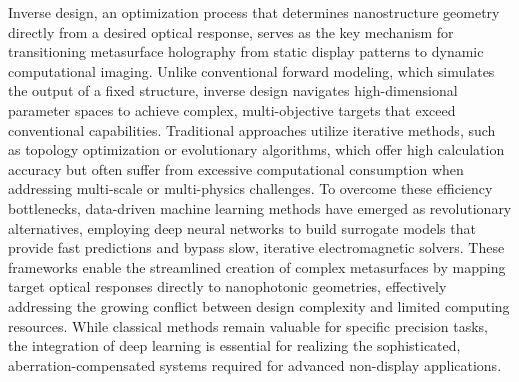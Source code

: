 Inverse design, an optimization process that determines nanostructure geometry directly from a desired optical response, serves as the key mechanism for transitioning metasurface holography from static display patterns to dynamic computational imaging. \citep{doi_10_48550_arxiv_2506_21748_dc49c062} \citep{doi_10_1117_12_3099014_831c7349} Unlike conventional forward modeling, which simulates the output of a fixed structure, inverse design navigates high-dimensional parameter spaces to achieve complex, multi-objective targets that exceed conventional capabilities. Traditional approaches utilize iterative methods, such as topology optimization or evolutionary algorithms, which offer high calculation accuracy but often suffer from excessive computational consumption when addressing multi-scale or multi-physics challenges. To overcome these efficiency bottlenecks, data-driven machine learning methods have emerged as revolutionary alternatives, employing deep neural networks to build surrogate models that provide fast predictions and bypass slow, iterative electromagnetic solvers. These frameworks enable the streamlined creation of complex metasurfaces by mapping target optical responses directly to nanophotonic geometries, effectively addressing the growing conflict between design complexity and limited computing resources. While classical methods remain valuable for specific precision tasks, the integration of deep learning is essential for realizing the sophisticated, aberration-compensated systems required for advanced non-display applications. \citep{doi_10_1088_1361_6439_ad3a72_72d60f33} \citep{doi_10_48550_arxiv_2204_00433_1c5cfd3e}

